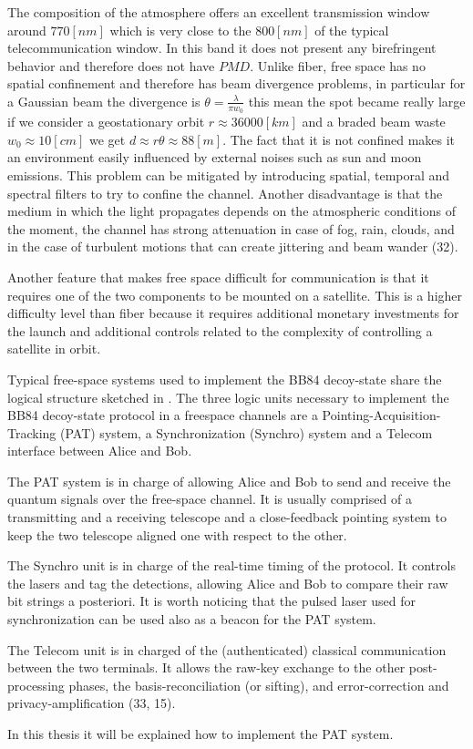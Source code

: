 The composition of the atmosphere offers an excellent transmission window around $770 [nm]$ which is very close to the $800 [nm]$ of the typical telecommunication window. In this band it does not present any birefringent behavior and therefore does not have $PMD$. Unlike fiber, free space has no spatial confinement and therefore has beam divergence problems, in particular for a Gaussian beam the divergence is $\theta = \frac{\lambda}{\pi w_0}$ this mean the spot became really large if we consider a geostationary orbit $r \approx 36000[km]$ and a braded beam waste $w_0 \approx 10 [cm]$ we get $d \approx r \theta \approx 88 [m]$. The fact that it is not confined makes it an environment easily influenced by external noises such as sun and moon emissions. This problem can be mitigated by introducing spatial, temporal and spectral filters to try to confine the channel. Another disadvantage is that the medium in which the light propagates depends on the atmospheric conditions of the moment, the channel has strong attenuation in case of fog, rain, clouds, and in the case of turbulent motions that can create jittering and beam wander (32).

Another feature that makes free space difficult for communication is that it requires one of the two components to be mounted on a satellite. This is a higher difficulty level than fiber because it requires additional monetary investments for the launch and additional controls related to the complexity of controlling a satellite in orbit.

Typical free-space systems used to implement the BB84 decoy-state share the logical structure sketched in . The three logic units necessary to implement the BB84 decoy-state protocol in a freespace channels are a Pointing-Acquisition-Tracking (PAT) system, a Synchronization (Synchro) system and a Telecom interface between Alice and Bob.

The PAT system is in charge of allowing Alice and Bob to send and receive the quantum signals over the free-space channel. It is usually comprised of a transmitting and a receiving telescope and a close-feedback pointing system to keep the two telescope aligned one with respect to the other.

The Synchro unit is in charge of the real-time timing of the protocol. It controls the lasers and tag the detections, allowing Alice and Bob to compare their raw bit strings a posteriori. It is worth noticing that the pulsed laser used for synchronization can be used also as a beacon for the PAT system.

The Telecom unit is in charged of the (authenticated) classical communication between the two terminals. It allows the raw-key exchange to the other post-processing phases, the basis-reconciliation (or sifting), and error-correction and privacy-amplification (33, 15).

In this thesis it will be explained how to implement the PAT system.